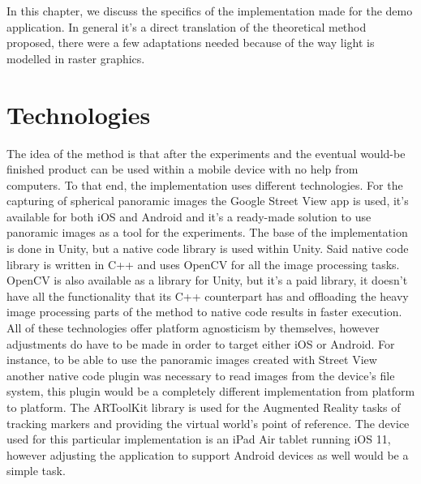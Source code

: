 
In this chapter,  we discuss the specifics of the implementation made for the demo application. In general it's a direct translation of the theoretical method proposed, there were a few adaptations needed because of the way light is modelled in raster graphics.

\section{Technologies}
The idea of the method is that after the experiments and the eventual would-be finished product can be used within a mobile device with no help from computers. To that end, the implementation uses different technologies. For the capturing of spherical panoramic images the Google Street View app is used, it's available for both iOS and Android and it's a ready-made solution to use panoramic images as a tool for the experiments. The base of the implementation is done in Unity, but a native code library is used within Unity. Said native code library is written in C++ and uses OpenCV for all the image processing tasks. OpenCV is also available as a library for Unity, but it's a paid library, it doesn't have all the functionality that its C++ counterpart has and offloading the heavy image processing parts of the method to native code results in faster execution.\newline
All of these technologies offer platform agnosticism by themselves, however adjustments do have to be made in order to target either iOS or Android. For instance, to be able to use the panoramic images created with Street View another native code plugin was necessary to read images from the device's file system, this plugin would be a completely different implementation from platform to platform. The ARToolKit library is used for the Augmented Reality tasks of tracking markers and providing the virtual world's point of reference. The device used for this particular implementation is an iPad Air tablet running iOS 11, however adjusting the application to support Android devices as well would be a simple task.\newline

